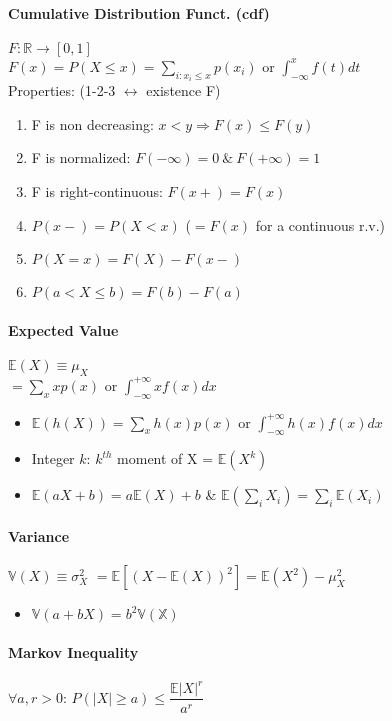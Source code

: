 \documentclass[paper=a4,fontsize=8pt,pagesize,DIV=calc]{scrartcl}
\newcounter{row}
\begin{document}
\begin{multicols}{3}
\paragraph{Cumulative Distribution Funct. (cdf)}$F:\mathbb{R}\rightarrow [0,1]$\\
$F(x)=P(X\leq x)=\sum_{i:x_i\leq x} p(x_i)$ or $\int^x_{-\infty}f(t)dt$\\
Properties: (1-2-3 $\leftrightarrow$ existence F)
\begin{enumerate}
\item F is non decreasing: $x<y \Rightarrow F(x) \leq F(y)$
\item F is normalized: $F(-\infty)=0 \ \& \ F(+\infty)=1$
\item F is right-continuous: $F(x+)=F(x)$
\item $P(x-)=P(X<x)$ ($=F(x)$ for a continuous r.v.)
\item $P(X=x)=F(X)-F(x-)$
\item $P(a < X \leq b)=F(b)-F(a)$
\end{enumerate}
\paragraph{Expected Value} $\mathbb{E}(X)\equiv\mu_X$\\
$=\sum_x xp(x)$ or $\int^{+\infty}_{-\infty}xf(x)dx$
\begin{itemize}
\item $\mathbb{E}(h(X))=\sum_x h(x)p(x)$ or $\int^{+\infty}_{-\infty}h(x)f(x)dx$
\item Integer $k$: $k^{th}$ moment of X = $\mathbb{E}(X^k)$
\item $\mathbb{E}(aX+b)=a\mathbb{E}(X)+b$ \& $\mathbb{E}(\sum_i X_i)=\sum_i \mathbb{E}(X_i)$
\end{itemize}

\paragraph{Variance} $\mathbb{V}(X)\equiv\sigma^2_X$
$=\mathbb{E}[(X-\mathbb{E}(X))^2]=\mathbb{E}(X^2)-\mu_X^2$
\begin{itemize}
\item $\mathbb{V}(a+bX)=b^2\mathbb{V(X)}$
\end{itemize}

\paragraph{Markov Inequality} $\forall a,r>0$: $P(|X|\geq a)\leq   \dfrac{\mathbb{E}|X|^r}{a^r}$ 

\end{multicols}
\end{document}
